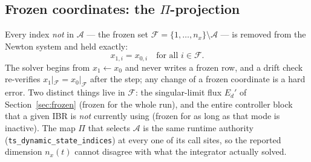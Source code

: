 \documentclass[12pt,a4paper]{article}
\theoremstyle{remark}
\begin{document}
\subsection{Frozen coordinates: the $\Pi$-projection}\label{sec:ts-frozen}
Every index \emph{not} in $\mathcal{A}$ --- the frozen set
$\mathcal{F}=\{1,\dots,n_x\}\setminus\mathcal{A}$ --- is removed from the Newton
system and held exactly:
\begin{equation}
  x_{1,i}=x_{0,i}\quad\text{for all }i\in\mathcal{F}.
  \label{eq:frozen}
\end{equation}
The solver begins from $x_1\!\leftarrow\!x_0$ and never writes a frozen row, and a
drift check re-verifies $x_{1}|_{\mathcal F}=x_{0}|_{\mathcal F}$ after the step;
any change of a frozen coordinate is a hard error. Two distinct things live in
$\mathcal{F}$: the singular-limit flux $E_d'$ of Section~\ref{sec:frozen} (frozen
for the whole run), and the entire controller block that a given IBR is
\emph{not} currently using (frozen for as long as that mode is inactive). The map
$\Pi$ that selects $\mathcal{A}$ is the same runtime authority
(\texttt{ts\_dynamic\_state\_indices}) at every one of its call sites, so the
reported dimension $n_x(t)$ cannot disagree with what the integrator actually
solved.
\end{document}
